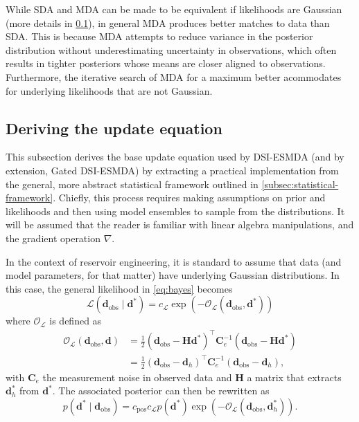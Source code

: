 While SDA and MDA can be made to be equivalent if likelihoods are Gaussian 
(more details in \cref{subsec:update-equation}), 
in general MDA produces better matches to data than SDA.
This is because MDA attempts to reduce variance in the posterior distribution 
without underestimating uncertainty in observations, 
which often results in tighter posteriors whose means are closer aligned to observations.
%
Furthermore, the iterative search of MDA for a maximum 
better acommodates for underlying likelihoods that are not Gaussian.

\subsection{Deriving the update equation}
\label{subsec:update-equation}
This subsection derives the base update equation used by DSI-ESMDA 
(and by extension, Gated DSI-ESMDA) 
by extracting a practical implementation from the general, more abstract 
statistical framework outlined in \cref{subsec:statistical-framework}.
%
Chiefly, this process requires making assumptions on prior and likelihoods 
and then using model ensembles to sample from the distributions. 
%
It will be assumed that the reader is familiar with linear algebra manipulations, and the gradient operation $\nabla$.

In the context of reservoir engineering, it is standard to assume that data 
(and model parameters, for that matter)
have underlying Gaussian distributions.
%
In this case, the general likelihood in \cref{eq:bayes} becomes
%
\begin{equation}
    \mathcal{L}(\mathbf{d}_\text{obs} \mid \mathbf{d}^*) =
    c_\mathcal{L} \exp(-\mathcal{O}_\mathcal{L}(\mathbf{d}_\text{obs}, \mathbf{d}^*))
\end{equation}
%
where $\mathcal{O}_\mathcal{L}$ is defined as
%
\begin{align}
    \mathcal{O}_\mathcal{L}(\mathbf{d}_\text{obs}, \mathbf{d}) 
    &=
    \frac{1}{2} 
    (\mathbf{d}_\text{obs} - \mathbf{H}\mathbf{d}^*)^\top 
    \mathbf{C}_e^{-1}
    (\mathbf{d}_\text{obs} - \mathbf{H}\mathbf{d}^*)\\
    &=
    \frac{1}{2} 
    (\mathbf{d}_\text{obs} - \mathbf{d}_h)^\top 
    \mathbf{C}_e^{-1}
    (\mathbf{d}_\text{obs} - \mathbf{d}_h),
\end{align}
%
with $\mathbf{C}_e$ the measurement noise in observed data and 
$\mathbf{H}$ a matrix that extracts $\mathbf{d}^*_h$ from $\mathbf{d}^*$.
%
The associated posterior can then be rewritten as 
%
\begin{equation}
    p(\mathbf{d}^* \mid \mathbf{d}_\text{obs}) = 
    c_\text{pos} 
    c_\mathcal{L} 
    p(\mathbf{d}^*) 
    \exp(-\mathcal{O}_\mathcal{L}(\mathbf{d}_\text{obs}, \mathbf{d}^*_h)).
\label{eq:posterior}
\end{equation}


